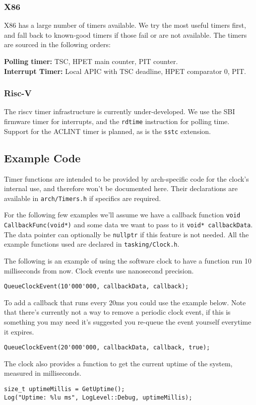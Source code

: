 \subsubsection{X86}
X86 has a large number of timers available. We try the most useful timers first, and fall back to known-good timers if those fail or are not available. The timers are sourced in the following orders:

\textbf{Polling timer:} TSC, HPET main counter, PIT counter.\\
\textbf{Interrupt Timer:} Local APIC with TSC deadline, HPET comparator 0, PIT.

\subsubsection{Risc-V}
The riscv timer infrastructure is currently under-developed. We use the SBI firmware timer for interrupts, and the \verb|rdtime| instruction for polling time. Support for the ACLINT timer is planned, as is the \verb|sstc| extension.

\subsection{Example Code}
Timer functions are intended to be provided by arch-specific code for the clock's internal use, and therefore won't be documented here. Their declarations are available in \verb|arch/Timers.h| if specifics are required.

For the following few examples we'll assume we have a callback function \verb|void CallbackFunc(void*)| and some data we want to pass to it \verb|void* callbackData|. The data pointer can optionally be \verb|nullptr| if this feature is not needed. All the example functions used are declared in \verb|tasking/Clock.h|.

The following is an example of using the software clock to have a function run 10 milliseconds from now. Clock events use nanosecond precision.
\begin{lstlisting}[stringstyle=\color{black}\ttfamily]
QueueClockEvent(10'000'000, callbackData, callback);
\end{lstlisting}

To add a callback that runs every 20ms you could use the example below. Note that there's currently not a way to remove a periodic clock event, if this is something you may need it's suggested you re-queue the event yourself everytime it expires.
\begin{lstlisting}[stringstyle=\color{black}\ttfamily]
QueueClockEvent(20'000'000, callbackData, callback, true);
\end{lstlisting}

The clock also provides a function to get the current uptime of the system, measured in milliseconds.
\begin{lstlisting}
size_t uptimeMillis = GetUptime();
Log("Uptime: %lu ms", LogLevel::Debug, uptimeMillis);
\end{lstlisting}
